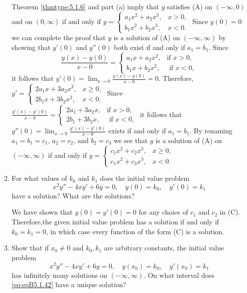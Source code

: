 \documentclass{ximera}
\begin{document}
\begin{problem}
\begin{enumerate}
\begin{solution}
    Theorem \ref{thmtype:5.1.6} and part (a) imply that $y$
satisfies (A) on $(-\infty,0)$ and on $(0,\infty)$ if and only if
$y=\left\{\begin{array}{rr}
a_1x^2+a_2x^3,&x> 0,\\
b_1x^2+b_2x^3,&x<0.
\end{array}\right.$
 Since $y(0)=0$ we can  complete the proof that $y$ is
a solution of
(A) on $(-\infty,\infty)$ by showing
that $y'(0)$ and $y''(0)$ both exist if and only if $a_1=b_1$. Since
$$
\frac{y(x)-y(0)}{
x-0}=\left\{\begin{array}{cl}a_1x+a_2x^2,&\mbox{
if }x>0,\\ b_1x+b_2x^2,&\mbox{ if }x<0,\end{array}\right.
$$
 it follows
that $y'(0)=\lim_{x\to0}\frac{y(x)-y(0)}{ x-0}=0$. Therefore,
$y'=\left\{\begin{array}{rr}
2a_1x+3a_2x^2,&x\ge 0,\\
2b_1x+3b_2x^2,&x<0.
\end{array}\right.$
Since
$\frac{y'(x)-y'(0)}{
x-0}=\left\{\begin{array}{cl}2a_1+3a_2x,&\mbox{
if }x>0,\\ 2b_1+3b_2x,&\mbox{ if }x<0,\end{array}\right.$ it
follows
that $y''(0)=\lim_{x\to0}\frac{y'(x)-y'(0)}{ x-0}$ exists
if and only if $a_1=b_1$.  By renaming $a_1=b_1=c_1$, $a_2=c_2$,
and $b_2=c_3$  we see that $y$ is a solution of
(A) on $(-\infty,\infty)$ if and only if
$y=\left\{\begin{array}{rr}
c_1x^2+c_2x^3,&x\ge 0,\\
c_1x^2+c_3x^3,&x<0.
\end{array}\right.$
\end{solution}
\item %
 For what values of $k_0$ and  $k_1$
does the initial value problem
$$
x^2y''-4xy'+6y=0,\quad y(0)=k_0,\quad y'(0)=k_1
$$
have a solution? What are the solutions?
\begin{solution}
    We have shown that $y(0)=y'(0)=0$ for any choice
of $c_1$ and $c_2$ in (C). Therefore,the given initial value problem
has a solution if and only if $k_0=k_1=0$, in which case every
function of the form (C) is a solution.
\end{solution}

\item %
 Show that if $x_0\ne0$ and $k_0,k_1$  are
arbitrary constants,  the initial value problem
\begin{equation}\label{eq:eqB5.1.42}
x^2y''-4xy'+6y=0,\quad y(x_0)=k_0,\quad y'(x_0)=k_1
\end{equation}
has infinitely many solutions on $(-\infty,\infty)$.  On what interval does
\ref{eq:eqB5.1.42} have a unique solution?


\end{enumerate}
\end{problem}
\end{document}
